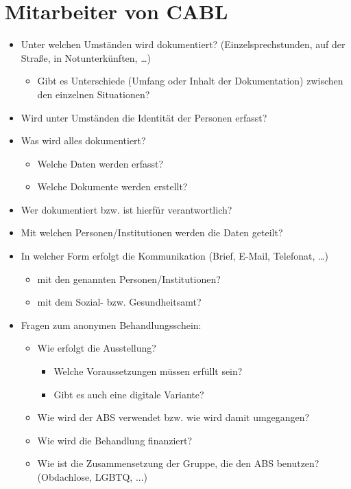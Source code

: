 \newpage

\section{Mitarbeiter von CABL}

\begin{itemize}
	\item Unter welchen Umständen wird dokumentiert? (Einzelsprechstunden, auf der Straße, in Notunterkünften, …)
	\begin{itemize}
		\item Gibt es Unterschiede (Umfang oder Inhalt der Dokumentation) zwischen den einzelnen Situationen?
	\end{itemize}
	\item Wird unter Umständen die Identität der Personen erfasst?
	\item Was wird alles dokumentiert?
	\begin{itemize}
		\item Welche Daten werden erfasst?
		\item Welche Dokumente werden erstellt?
	\end{itemize}
	\item Wer dokumentiert bzw. ist hierfür verantwortlich?
	\item Mit welchen Personen/Institutionen werden die Daten geteilt?
	\item In welcher Form erfolgt die Kommunikation (Brief, E-Mail, Telefonat, …)
	\begin{itemize}
		\item mit den genannten Personen/Institutionen?
		\item mit dem Sozial- bzw. Gesundheitsamt?
	\end{itemize}
	\item Fragen zum anonymen Behandlungsschein:
	\begin{itemize}
		\item Wie erfolgt die Ausstellung?
		\begin{itemize}
			\item Welche Voraussetzungen müssen erfüllt sein?
			\item Gibt es auch eine digitale Variante?
		\end{itemize}
		\item Wie wird der ABS verwendet bzw. wie wird damit umgegangen?
		\item Wie wird die Behandlung finanziert?
		\item Wie ist die Zusammensetzung der Gruppe, die den ABS benutzen? (Obdachlose, LGBTQ, ...)
	\end{itemize}	
\end{itemize}

